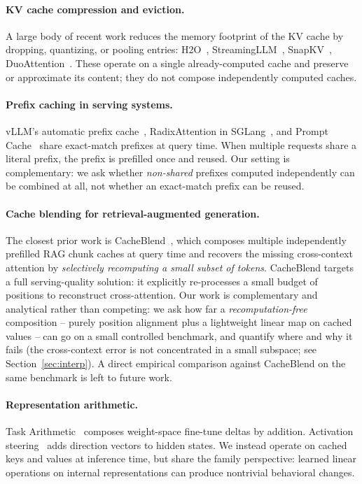 \documentclass[11pt]{article}
\begin{document}
\paragraph{KV cache compression and eviction.} A large body of recent work reduces the memory footprint of the KV cache by dropping, quantizing, or pooling entries: H2O~\citep{zhang2023h2o}, StreamingLLM~\citep{xiao2023streamingllm}, SnapKV~\citep{li2024snapkv}, DuoAttention~\citep{xiao2024duoattention}. These operate on a single already-computed cache and preserve or approximate its content; they do not compose independently computed caches.

\paragraph{Prefix caching in serving systems.} vLLM's automatic prefix cache~\citep{kwon2023vllm}, RadixAttention in SGLang~\citep{zheng2024sglang}, and Prompt Cache~\citep{gim2023prompt} share exact-match prefixes at query time. When multiple requests share a literal prefix, the prefix is prefilled once and reused. Our setting is complementary: we ask whether \emph{non-shared} prefixes computed independently can be combined at all, not whether an exact-match prefix can be reused.

\paragraph{Cache blending for retrieval-augmented generation.} The closest prior work is CacheBlend~\citep{yao2024cacheblend}, which composes multiple independently prefilled RAG chunk caches at query time and recovers the missing cross-context attention by \emph{selectively recomputing a small subset of tokens}. CacheBlend targets a full serving-quality solution: it explicitly re-processes a small budget of positions to reconstruct cross-attention. Our work is complementary and analytical rather than competing: we ask how far a \emph{recomputation-free} composition -- purely position alignment plus a lightweight linear map on cached values -- can go on a small controlled benchmark, and quantify where and why it fails (the cross-context error is not concentrated in a small subspace; see Section~\ref{sec:interp}). A direct empirical comparison against CacheBlend on the same benchmark is left to future work.

\paragraph{Representation arithmetic.} Task Arithmetic~\citep{ilharco2022editing} composes weight-space fine-tune deltas by addition. Activation steering~\citep{turner2023activation} adds direction vectors to hidden states. We instead operate on cached keys and values at inference time, but share the family perspective: learned linear operations on internal representations can produce nontrivial behavioral changes.
\end{document}
